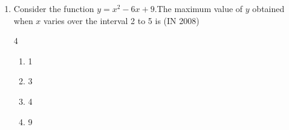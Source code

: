 \begin{enumerate}[label=\thesubsection.\arabic*,ref=\thesubsection.\theenumi]
    \item  Consider the function $y=x^2 -6x +9$.The maximum value of $y$ obtained when $x$ varies over the interval 2 to 5 is \hfill{(IN 2008)}
    \begin{multicols}{4}
    \begin{enumerate} 
        \item 1
        \item 3 
        \item 4 
        \item 9
    \end{enumerate}
    \end{multicols}
\end{enumerate}

